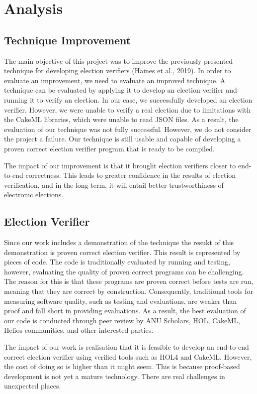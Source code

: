 \chapter{Analysis}

\section{Technique Improvement} 
The main objective of this project was to improve the previously presented technique for developing election verifiers (Haines et al., 2019). In order to evaluate an improvement, we need to evaluate an improved technique. A technique can be evaluated by applying it to develop an election verifier and running it to verify an election.
In our case, we successfully developed an election verifier. However, we were unable to verify a real election due to limitations with the CakeML libraries, which were unable to read JSON files. As a result, the evaluation of our technique was not fully successful.
However, we do not consider the project a failure. Our technique is still usable and capable of developing a proven correct election verifier program that is ready to be compiled.

The impact of our improvement is that it brought election verifiers closer to end-to-end correctness. This leads to greater confidence in the results of election verification, and in the long term, it will entail better trustworthiness of electronic elections.

\section{Election Verifier}
Since our work includes a demonstration of the technique the resukt of this demonstration is proven correct election verifier. This result is represented by pieces of code. The code is traditionally evaluated by running and testing, however, evaluating the quality of proven correct programs can be challenging. The reason for this is that these programs are proven correct before tests are run, meaning that they are correct by construction. Consequently, traditional tools for measuring software quality, such as testing and evaluations, are weaker than proof and fall short in providing evaluations. As a result, the best evaluation of our code is conducted through peer review by ANU Scholars, HOL, CakeML, Helios communities, and other interested parties.

The impact of our work is realisation that it is feasible to develop an end-to-end correct election verifier using verified tools such as HOL4 and CakeML. However, the cost of doing so is higher than it might seem. This is because proof-based development is not yet a mature technology. There are real challenges in unexpected places.


